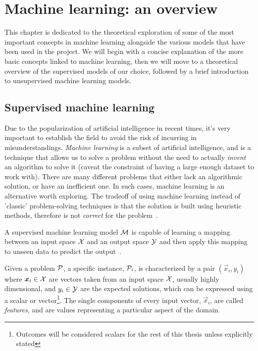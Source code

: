 \chapter{Machine learning: an overview}
\label{chp:ml}
This chapter is dedicated to the theoretical exploration of some of the most important concepts in
machine learning alongside the various models that have been used in the project. We will begin with
a concise explanation of the more basic concepts linked to machine learning, then we will move to a
theoretical overview of the supervised models of our choice, followed by a brief introduction to
unsupervised machine learning models.

\section{Supervised machine learning}
\label{sec:sml}
Due to the popularization of artificial intelligence in recent times, it's very important to
establish the field to avoid the risk of incurring in misunderstandings. \emph{Machine learning} is
a subset of artificial intelligence, and is a technique that allows us to solve a problem without
the need to actually \emph{invent} an algorithm to solve it (caveat the constraint of having a large
enough dataset to work with). There are many different problems that either lack an algorithmic
solution, or have an inefficient one. In such cases, machine learning is an alternative worth
exploring. The tradeoff of using machine learning instead of 'classic' problem-solving techniques is
that the solution is built using heuristic methods, therefore is not \emph{correct} for the problem~\cite{Rebala2019}.

A supervised machine learning model $\mathcal{M}$ is capable of learning a mapping between an
input space $\mathcal{X}$ and an output space $\mathcal{Y}$ and then apply this mapping to unseen
data to predict the output~\cite{Cunningham2008}.

Given a problem $\mathcal{P}$, a specific instance, $\mathcal{P}_i$, is characterized by a pair
$(\vec{x}_i, y_i)$ where $\boldsymbol{x}_i \in \mathcal{X}$ are vectors taken from an input space $\mathcal{X}$, usually
highly dimensional, and $y_i \in \mathcal{Y}$ are the expected solutions, which can be expressed using a scalar or vector\footnote{Outcomes will be considered scalars for the rest of this thesis unless explicitly stated}. The single components of every input vector, $\vec{x}_i$, are called \emph{features}, and are values representing a particular aspect of the domain.

